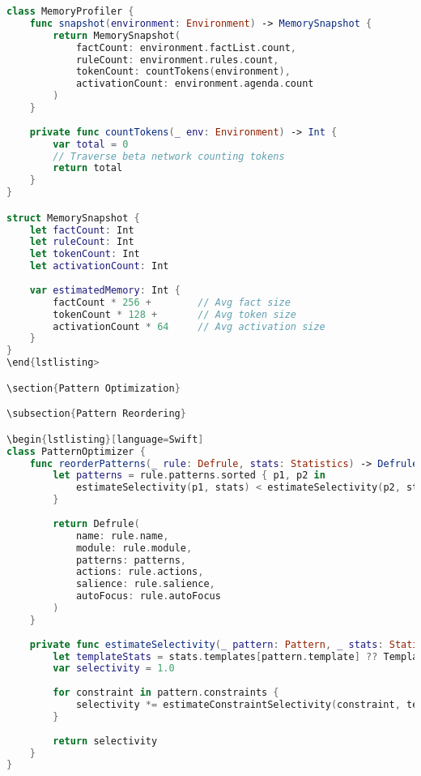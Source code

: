 \begin{lstlisting}[language=Swift]
class MemoryProfiler {
    func snapshot(environment: Environment) -> MemorySnapshot {
        return MemorySnapshot(
            factCount: environment.factList.count,
            ruleCount: environment.rules.count,
            tokenCount: countTokens(environment),
            activationCount: environment.agenda.count
        )
    }
    
    private func countTokens(_ env: Environment) -> Int {
        var total = 0
        // Traverse beta network counting tokens
        return total
    }
}

struct MemorySnapshot {
    let factCount: Int
    let ruleCount: Int
    let tokenCount: Int
    let activationCount: Int
    
    var estimatedMemory: Int {
        factCount * 256 +        // Avg fact size
        tokenCount * 128 +       // Avg token size
        activationCount * 64     // Avg activation size
    }
}
\end{lstlisting>

\section{Pattern Optimization}

\subsection{Pattern Reordering}

\begin{lstlisting}[language=Swift]
class PatternOptimizer {
    func reorderPatterns(_ rule: Defrule, stats: Statistics) -> Defrule {
        let patterns = rule.patterns.sorted { p1, p2 in
            estimateSelectivity(p1, stats) < estimateSelectivity(p2, stats)
        }
        
        return Defrule(
            name: rule.name,
            module: rule.module,
            patterns: patterns,
            actions: rule.actions,
            salience: rule.salience,
            autoFocus: rule.autoFocus
        )
    }
    
    private func estimateSelectivity(_ pattern: Pattern, _ stats: Statistics) -> Double {
        let templateStats = stats.templates[pattern.template] ?? TemplateStats()
        var selectivity = 1.0
        
        for constraint in pattern.constraints {
            selectivity *= estimateConstraintSelectivity(constraint, templateStats)
        }
        
        return selectivity
    }
}
\end{lstlisting}

